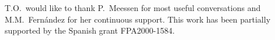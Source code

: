 \documentclass[12pt,a4paper]{article}
\begin{document}
T.O.~would like to thank P.~Meessen for most useful conversations and
M.M.~Fern\'andez for her continuous support.  This work has been
partially supported by the Spanish grant FPA2000-1584.


\appendix





\end{document}
